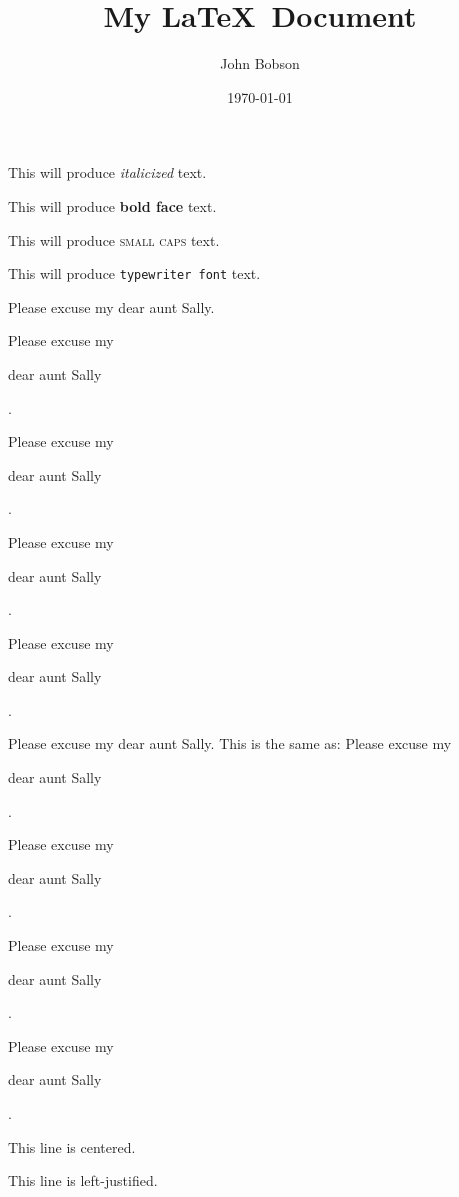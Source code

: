 \documentclass[11pt]{article}
\title{My \LaTeX\ Document}
\author{John Bobson}
\date{\today}
\begin{document}
\tableofcontentsk
\maketitle

This will produce \textit{italicized} text.

This will produce \textbf{bold face} text.

This will produce \textsc{small caps} text.

This will produce \texttt{typewriter font} text.

\vspace{1cm}

Please excuse my dear aunt Sally.

Please excuse my \begin{large}dear aunt Sally\end{large}.

Please excuse my \begin{Large}dear aunt Sally\end{Large}.

Please excuse my \begin{huge}dear aunt Sally\end{huge}.

Please excuse my \begin{Huge}dear aunt Sally\end{Huge}.

Please excuse my dear aunt Sally. This is the same as: Please excuse my \begin{normalsize}dear aunt Sally\end{normalsize}.

Please excuse my \begin{small}dear aunt Sally\end{small}.

Please excuse my \begin{scriptsize}dear aunt Sally\end{scriptsize}.

Please excuse my \begin{tiny}dear aunt Sally\end{tiny}.

\vspace{1cm}

\begin{center}
This line is centered.
\end{center}

\begin{flushleft}
This line is left-justified.
\end{flushleft}
\end{document}
